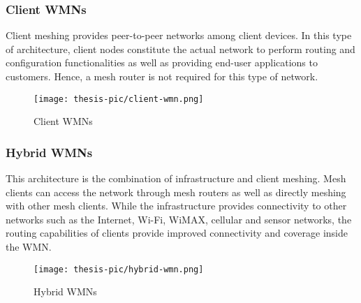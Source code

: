 \documentclass[12pt,a4paper]{report}
\begin{document}
\subsubsection{Client WMNs}
Client meshing provides peer-to-peer networks among client devices. In this type of architecture, client nodes constitute the actual network to perform routing and configuration functionalities as well as providing end-user applications to customers. Hence, a mesh router is not required for this type of network.
\begin{figure}[H]
\centering
\texttt{[image: thesis-pic/client-wmn.png]}
\caption{Client WMNs}
\end{figure}




\subsubsection{Hybrid WMNs}
This architecture is the combination of infrastructure and client meshing. Mesh clients can access the network through mesh routers as well as directly meshing with other mesh clients. While the infrastructure provides connectivity to other networks such as the Internet, Wi-Fi, WiMAX, cellular and sensor networks, the routing capabilities of clients provide improved connectivity and coverage inside the WMN.
\begin{figure}[H]
\centering
\texttt{[image: thesis-pic/hybrid-wmn.png]}
\caption{Hybrid WMNs}
\end{figure}
\end{document}
